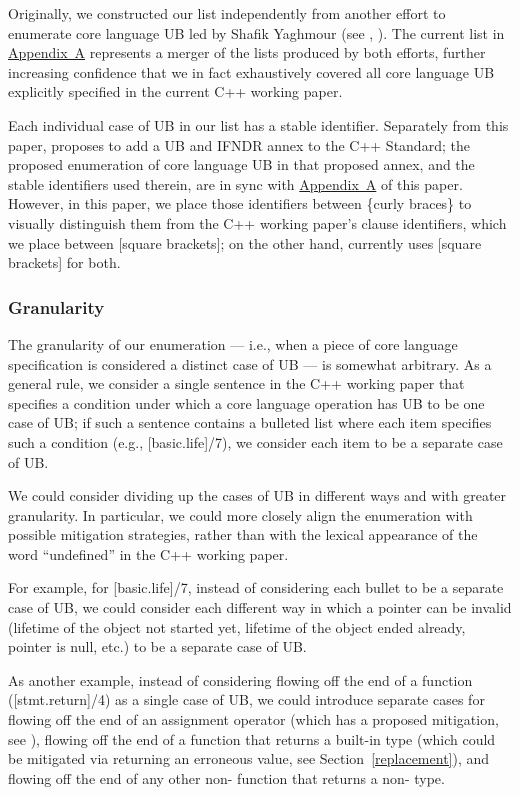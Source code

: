 Originally, we constructed our list independently from another effort to enumerate core language UB led by Shafik Yaghmour (see \cite{P1705R1}, \cite{P3075R0}). The current list in \hyperref[appendix]{Appendix~A} represents a merger of the lists produced by both efforts, further increasing confidence that we in fact exhaustively covered all core language UB explicitly specified in the current C++ working paper.

Each individual case of UB in our list has a stable identifier. Separately from this paper, \cite{P3596R1} proposes to add a UB and IFNDR annex to the C++ Standard; the proposed enumeration of core language UB in that proposed annex, and the stable identifiers used therein, are in sync with \hyperref[appendix]{Appendix~A} of this paper. However, in this paper, we place those identifiers between \{curly braces\} to visually distinguish them from the C++ working paper's clause identifiers, which we place between [square brackets]; on the other hand, \cite{P3596R1} currently uses [square brackets] for both.

\subsubsection{Granularity}

The granularity of our enumeration --- i.e., when a piece of core language specification is considered a distinct case of UB --- is somewhat arbitrary. As a general rule, we consider a single sentence in the C++ working paper that specifies a condition under which a core language operation has UB to be one case of UB; if such a sentence contains a bulleted list where each item specifies such a condition (e.g., [basic.life]/7), we consider each item to be a separate case of UB.

We could consider dividing up the cases of UB in different ways and with greater granularity. In particular, we could more closely align the enumeration with possible mitigation strategies, rather than with the lexical appearance of the word ``undefined'' in the C++ working paper.

For example, for [basic.life]/7, instead of considering each bullet to be a separate case of UB, we could consider each different way in which a pointer can be invalid (lifetime of the object not started yet, lifetime of the object ended already, pointer is null, etc.) to be a separate case of UB.

As another example, instead of considering flowing off the end of a function ([stmt.return]/4) as a single case of UB, we could introduce separate cases for flowing off the end of an assignment operator (which has a proposed mitigation, see \cite{P2973R0}), flowing off the end of a function that returns a built-in type (which could be mitigated via returning an erroneous value, see Section~\ref{replacement}), and flowing off the end of any other non- function that returns a non- type.

